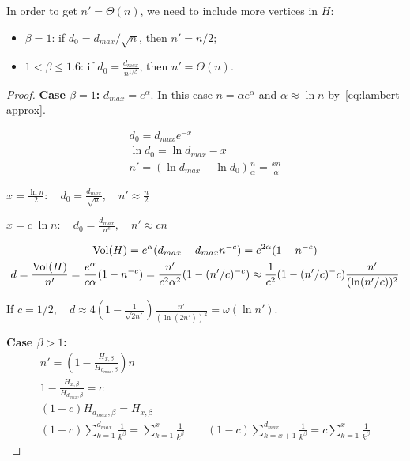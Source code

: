 \begin{lemma}
    \label{lem:powerlaw-coin-toss-size-vol-of-h-large}
    In order to get $n'=\Theta(n)$, we need to include more vertices in $H$:
    \begin{itemize}
        \item $\beta=1$: if $d_0=d_{max}/\sqrt{n}$, then $n'=n/2$;
        \item $1<\beta\leq 1.6$: if $d_0=\frac{d_{max}}{n^{1/\beta}}$, then $n'=\Theta(n)$.
    \end{itemize}
\end{lemma}

\begin{proof}
    \textbf{Case $\beta=1$:}
    $d_{max}=e^\alpha$. In this case $n=\alpha e^\alpha$
    and $\alpha\approx\ln n$ by~\eqref{eq:lambert-approx}.
    
    \begin{gather*}
        d_0=d_{max}e^{-x}\\
        \ln d_0=\ln d_{max}-x\\
        n'=(\ln d_{max}-\ln d_0)\frac{n}{\alpha}=\frac{xn}{\alpha}
    \end{gather*}

    $x=\frac{\ln n}{2}:\quad d_0=\frac{d_{max}}{\sqrt{n}},\quad n'\approx\frac{n}{2}$
    
    $x=c\;\ln n:\quad d_0=\frac{d_{max}}{n^c},\quad n'\approx cn$
    
    \begin{gather*}
        \Vol(H)=e^\alpha(d_{max}-d_{max}n^{-c})=e^{2\alpha}(1-n^{-c})\\
        d=\frac{\Vol(H)}{n'}=\frac{e^\alpha}{c\alpha}(1-n^{-c}) %
        =\frac{n'}{c^2\alpha^2}(1-(n'/c)^{-c})
        \approx\frac{1}{c^2}(1-(n'/c)^-c)\frac{n'}{(\ln (n'/c))^2}
    \end{gather*}
    
    If $c=1/2,\quad d\approx4\left(1-\frac{1}{\sqrt{2n'}}\right)\frac{n'}{(\ln (2n'))^2}=\omega(\ln n')$.
    
    \textbf{Case $\beta>1$:}
    \begin{gather*}
        n'=\left(1-\frac{H_{x,\beta}}{H_{d_{max},\beta}}\right)n\\
        1-\frac{H_{x,\beta}}{H_{d_{max},\beta}}=c\\
        (1-c)H_{d_{max},\beta}=H_{x,\beta}\\
        (1-c)\sum_{k=1}^{d_{max}}\frac{1}{k^\beta}=\sum_{k=1}^{x}\frac{1}{k^\beta}
        \qquad(1-c)\sum_{k=x+1}^{d_{max}}\frac{1}{k^\beta}=c\sum_{k=1}^{x}\frac{1}{k^\beta}
    \end{gather*}
    

\end{proof}
